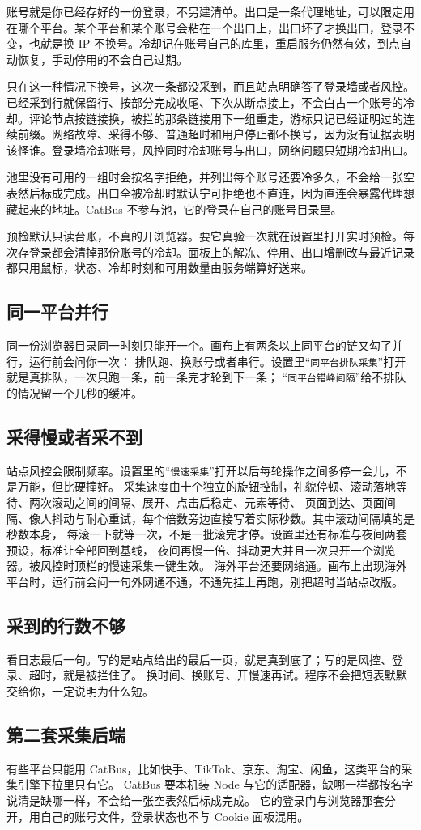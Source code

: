 账号就是你已经存好的一份登录，不另建清单。出口是一条代理地址，可以限定用在哪个平台。某个平台和某个账号会粘在一个出口上，出口坏了才换出口，登录不变，也就是换 IP 不换号。冷却记在账号自己的库里，重启服务仍然有效，到点自动恢复，手动停用的不会自己过期。

只在这一种情况下换号，这次一条都没采到，而且站点明确答了登录墙或者风控。已经采到行就保留行、按部分完成收尾、下次从断点接上，不会白占一个账号的冷却。评论节点按链接换，被拦的那条链接用下一组重走，游标只记已经证明过的连续前缀。网络故障、采得不够、普通超时和用户停止都不换号，因为没有证据表明该怪谁。登录墙冷却账号，风控同时冷却账号与出口，网络问题只短期冷却出口。

池里没有可用的一组时会按名字拒绝，并列出每个账号还要冷多久，不会给一张空表然后标成完成。出口全被冷却时默认宁可拒绝也不直连，因为直连会暴露代理想藏起来的地址。CatBus 不参与池，它的登录在自己的账号目录里。

预检默认只读台账，不真的开浏览器。要它真验一次就在设置里打开实时预检。每次存登录都会清掉那份账号的冷却。面板上的解冻、停用、出口增删改与最近记录都只用鼠标，状态、冷却时刻和可用数量由服务端算好送来。

\subsection{同一平台并行}

同一份浏览器目录同一时刻只能开一个。画布上有两条以上同平台的链又勾了并行，运行前会问你一次：
排队跑、换账号或者串行。设置里“\texttt{同平台排队采集}”打开就是真排队，一次只跑一条，前一条完才轮到下一条；
“\texttt{同平台错峰间隔}”给不排队的情况留一个几秒的缓冲。

\subsection{采得慢或者采不到}

站点风控会限制频率。设置里的“\texttt{慢速采集}”打开以后每轮操作之间多停一会儿，不是万能，但比硬撞好。
采集速度由十个独立的旋钮控制，礼貌停顿、滚动落地等待、两次滚动之间的间隔、展开、点击后稳定、元素等待、
页面到达、页面间隔、像人抖动与耐心重试，每个倍数旁边直接写着实际秒数。其中滚动间隔填的是秒数本身，
每滚一下就等一次，不是一批滚完才停。设置里还有标准与夜间两套预设，标准让全部回到基线，
夜间再慢一倍、抖动更大并且一次只开一个浏览器。被风控时顶栏的慢速采集一键生效。
海外平台还要网络通。画布上出现海外平台时，运行前会问一句外网通不通，不通先挂上再跑，别把超时当站点改版。

\subsection{采到的行数不够}

看日志最后一句。写的是站点给出的最后一页，就是真到底了；写的是风控、登录、超时，就是被拦住了。
换时间、换账号、开慢速再试。程序不会把短表默默交给你，一定说明为什么短。

\subsection{第二套采集后端}

有些平台只能用 CatBus，比如快手、TikTok、京东、淘宝、闲鱼，这类平台的采集引擎下拉里只有它。
CatBus 要本机装 Node 与它的适配器，缺哪一样都按名字说清是缺哪一样，不会给一张空表然后标成完成。
它的登录门与浏览器那套分开，用自己的账号文件，登录状态也不与 Cookie 面板混用。
